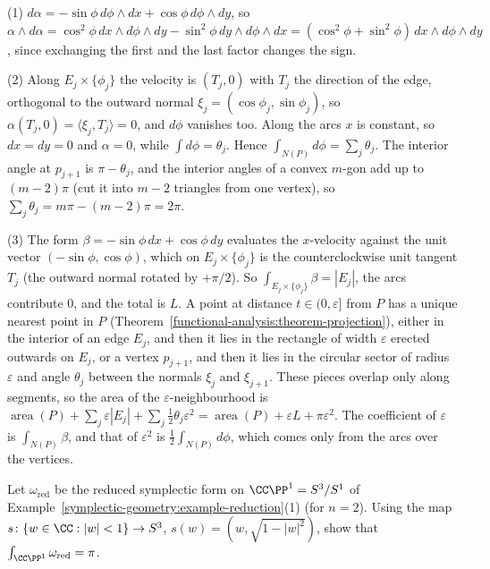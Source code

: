 \begin{solution}
(1) $d\alpha = -\sin\phi\,d\phi \wedge dx + \cos\phi\,d\phi \wedge dy$, so
$\alpha \wedge d\alpha = \cos^2\phi\,dx \wedge d\phi \wedge dy - \sin^2\phi\,dy \wedge d\phi \wedge dx = (\cos^2\phi + \sin^2\phi)\,dx \wedge d\phi \wedge dy$, since exchanging the first and the last factor changes the sign.

(2) Along $E_j \times \{\phi_j\}$ the velocity is $(T_j, 0)$ with $T_j$ the direction of the edge, orthogonal to the outward normal $\xi_j = (\cos\phi_j, \sin\phi_j)$, so $\alpha(T_j, 0) = \langle\xi_j, T_j\rangle = 0$, and
$d\phi$ vanishes too. Along the arcs $x$ is constant, so $dx = dy = 0$ and $\alpha = 0$, while $\int d\phi = \theta_j$. Hence $\int_{N(P)}d\phi = \sum_j\theta_j$. The interior angle at $p_{j+1}$ is $\pi - \theta_j$, and the
interior angles of a convex $m$-gon add up to $(m - 2)\pi$ (cut it into $m - 2$ triangles from one vertex), so $\sum_j\theta_j = m\pi - (m - 2)\pi = 2\pi$.

(3) The form $\beta = -\sin\phi\,dx + \cos\phi\,dy$ evaluates the $x$-velocity against the unit vector $(-\sin\phi, \cos\phi)$, which on $E_j \times \{\phi_j\}$ is the counterclockwise unit tangent $T_j$ (the
outward normal rotated by $+\pi/2$). So $\int_{E_j \times \{\phi_j\}}\beta = |E_j|$, the arcs contribute $0$, and the total is $L$. A point at distance $t \in (0, \varepsilon]$ from $P$ has a unique nearest point in $P$
(Theorem~\ref{functional-analysis:theorem-projection}), either in the interior of an edge $E_j$, and then it lies in the rectangle of width $\varepsilon$ erected
outwards on $E_j$, or a vertex $p_{j+1}$, and then it lies in the circular sector of radius $\varepsilon$ and angle $\theta_j$ between the normals $\xi_j$ and $\xi_{j+1}$. These pieces overlap only along segments, so
the area of the $\varepsilon$-neighbourhood is $\operatorname{area}(P) + \sum_j\varepsilon|E_j| + \sum_j\frac12\theta_j\varepsilon^2 = \operatorname{area}(P) + \varepsilon L + \pi\varepsilon^2$. The
coefficient of $\varepsilon$ is $\int_{N(P)}\beta$, and that of $\varepsilon^2$ is $\frac12\int_{N(P)}d\phi$, which comes only from the arcs over the vertices.
\end{solution}

\begin{exercise}\label{symplectic-geometry:exercise-reduction-area}
Let $\omega_{\mathrm{red}}$ be the reduced symplectic form on $\CC\PP^1 = S^3/S^1$ of Example~\ref{symplectic-geometry:example-reduction}(1) (for $n = 2$). Using the map
$s \colon \{w \in \CC : |w| < 1\} \to S^3$, $s(w) = (w, \sqrt{1 - |w|^2})$, show that $\int_{\CC\PP^1}\omega_{\mathrm{red}} = \pi$.
\end{exercise}

